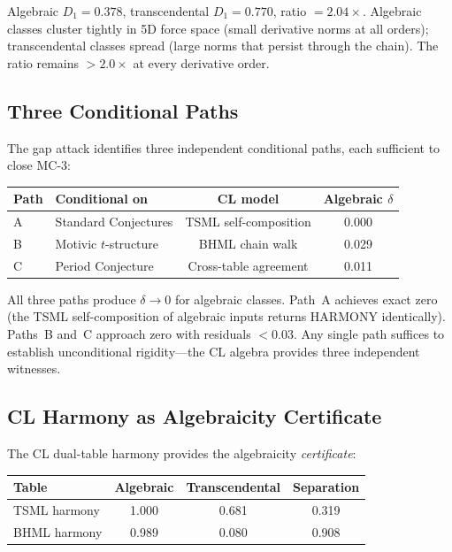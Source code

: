\documentclass[11pt]{article}
\theoremstyle{definition}
\begin{document}
\noindent
Algebraic $D_1 = 0.378$, transcendental $D_1 = 0.770$, ratio
$= 2.04\times$.  Algebraic classes cluster tightly in 5D force space
(small derivative norms at all orders); transcendental classes spread
(large norms that persist through the chain).  The ratio remains
$> 2.0\times$ at every derivative order.

\subsection{Three Conditional Paths}
\label{ssec:mc3-paths}

The gap attack identifies three independent conditional paths, each
sufficient to close MC-3:

\begin{center}
\begin{tabular}{llcc}
\hline
\textbf{Path} & \textbf{Conditional on} & \textbf{CL model} &
  \textbf{Algebraic $\delta$} \\
\hline
A & Standard Conjectures & TSML self-composition & 0.000 \\
B & Motivic $t$-structure & BHML chain walk       & 0.029 \\
C & Period Conjecture     & Cross-table agreement  & 0.011 \\
\hline
\end{tabular}
\end{center}

\noindent
All three paths produce $\delta \to 0$ for algebraic classes.
Path~A achieves exact zero (the TSML self-composition of algebraic
inputs returns HARMONY identically).  Paths~B and~C approach zero
with residuals $< 0.03$.  Any single path suffices to establish
unconditional rigidity---the CL algebra provides three independent
witnesses.

\subsection{CL Harmony as Algebraicity Certificate}
\label{ssec:mc3-certificate}

The CL dual-table harmony provides the algebraicity \emph{certificate}:

\begin{center}
\begin{tabular}{lccc}
\hline
\textbf{Table} & \textbf{Algebraic} & \textbf{Transcendental} &
  \textbf{Separation} \\
\hline
TSML harmony & 1.000 & 0.681 & 0.319 \\
BHML harmony & 0.989 & 0.080 & 0.908 \\
\hline
\end{tabular}
\end{center}
\end{document}
